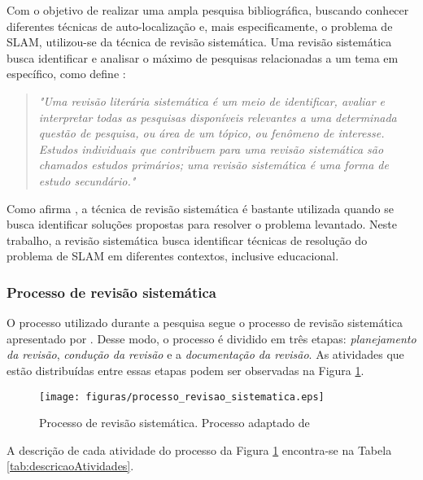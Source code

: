 	Com o objetivo de realizar uma ampla pesquisa bibliográfica, buscando conhecer diferentes técnicas de auto-localização e, mais especificamente, o problema de SLAM, utilizou-se da técnica de revisão sistemática. Uma revisão sistemática busca identificar e analisar o máximo de pesquisas relacionadas a um tema em específico, como define \cite[p. 8]{revisaoSistematicaComunicacao}:
	 \begin{quote}
	 	\textit{"Uma revisão literária sistemática é um meio de identificar, avaliar e interpretar
		todas as pesquisas disponíveis relevantes a uma determinada questão de pesquisa,
		ou área de um tópico, ou fenômeno de interesse. Estudos individuais que contribuem
		para uma revisão sistemática são chamados estudos primários; uma revisão
		sistemática é uma forma de estudo secundário."}
	 \end{quote}
	 Como afirma \cite{revisaoSistematicaComunicacao}, a técnica de revisão sistemática é bastante utilizada quando se busca identificar soluções propostas para resolver o problema levantado. Neste trabalho, a revisão sistemática busca identificar técnicas de resolução do problema de SLAM em diferentes contextos, inclusive educacional.

	 \subsubsection{Processo de revisão sistemática}

	 	O processo utilizado durante a pesquisa segue o processo de revisão sistemática apresentado por \cite{Kitchenham}. Desse modo, o processo é dividido em três etapas: \textit{planejamento da revisão}, \textit{condução da revisão} e a \textit{documentação da revisão}. As atividades que estão distribuídas entre essas etapas podem ser observadas na Figura \ref{img:processo_revisao_sistematica}.

	 	\begin{figure}[H]
			\centering
			\texttt{[image: figuras/processo\_revisao\_sistematica.eps]}
			\caption[Processo de revisão sistemática]{Processo de revisão sistemática. Processo adaptado de \cite{Kitchenham}}
			\label{img:processo_revisao_sistematica}
		\end{figure}
		\clearpage

		A descrição de cada atividade do processo da Figura \ref{img:processo_revisao_sistematica} encontra-se na Tabela \ref{tab:descricaoAtividades}.

